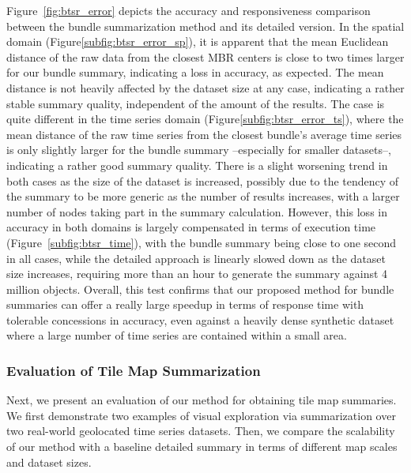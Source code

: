 Figure~\ref{fig:btsr_error} depicts the accuracy and responsiveness comparison between the bundle summarization method and its detailed version. In the spatial domain (Figure\ref{subfig:btsr_error_sp}), it is apparent that the mean Euclidean distance of the raw data from the closest MBR centers is close to two times larger for our bundle summary, indicating a loss in accuracy, as expected. The mean distance is not heavily affected by the dataset size at any case, indicating a rather stable summary quality, independent of the amount of the results. The case is quite different in the time series domain (Figure\ref{subfig:btsr_error_ts}), where the mean distance of the raw time series from the closest bundle's average time series is only slightly larger for the bundle summary --especially for smaller datasets--, indicating a rather good summary quality. There is a slight worsening trend in both cases as the size of the dataset is increased, possibly due to the tendency of the summary to be more generic as the number of results increases, with a larger number of \btsr nodes taking part in the summary calculation. However, this loss in accuracy in both domains is largely compensated in terms of execution time (Figure~\ref{subfig:btsr_time}), with the bundle summary being close to one second in all cases, while the detailed approach is linearly slowed down as the dataset size increases, requiring more than an hour to generate the summary against 4 million objects. Overall, this test confirms that our proposed method for bundle summaries can offer a really large speedup in terms of response time with tolerable concessions in accuracy, even against a heavily dense synthetic dataset where a large number of time series are contained within a small area.



\subsubsection{Evaluation of Tile Map Summarization}
\label{subsec:tilemap_sum}

Next, we present an evaluation of our method for obtaining tile map summaries. We first demonstrate two examples of visual exploration via summarization over two real-world geolocated time series datasets. Then, we compare the scalability of our method with a baseline detailed summary in terms of different map scales and dataset sizes.


